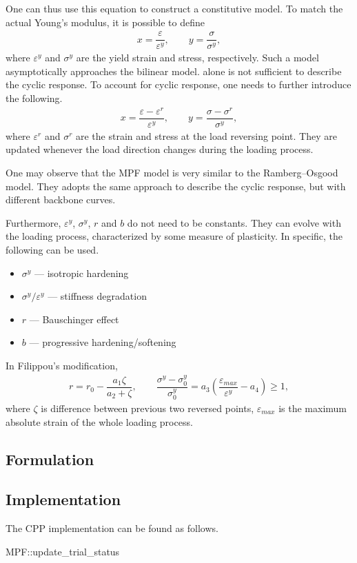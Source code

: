 One can thus use this equation to construct a constitutive model.
To match the actual Young's modulus, it is possible to define
\begin{gather}\label{eq:mpf_scaled}
	x=\dfrac{\varepsilon}{\varepsilon^y},\qquad
	y=\dfrac{\sigma}{\sigma^y},
\end{gather}
where $\varepsilon^y$ and $\sigma^y$ are the yield strain and stress, respectively.
Such a model asymptotically approaches the bilinear model.
 alone is not sufficient to describe the cyclic response.
To account for cyclic response, one needs to further introduce the following.
\begin{gather}
	x=\dfrac{\varepsilon-\varepsilon^r}{\varepsilon^y},\qquad
	y=\dfrac{\sigma-\sigma^r}{\sigma^y},
\end{gather}
where $\varepsilon^r$ and $\sigma^r$ are the strain and stress at the load reversing point.
They are updated whenever the load direction changes during the loading process.

One may observe that the MPF model is very similar to the Ramberg--Osgood model.
They adopts the same approach to describe the cyclic response, but with different backbone curves.

Furthermore, $\varepsilon^y$, $\sigma^y$, $r$ and $b$ do not need to be constants.
They can evolve with the loading process, characterized by some measure of plasticity.
In specific, the following can be used.
\begin{itemize}
	\item $\sigma^y$ --- isotropic hardening
	\item $\sigma^y/\varepsilon^y$ --- stiffness degradation
	\item $r$ --- Bauschinger effect
	\item $b$ --- progressive hardening/softening
\end{itemize}

In Filippou's modification,
\begin{gather}
	r=r_0-\dfrac{a_1\zeta}{a_2+\zeta},\qquad
	\dfrac{\sigma^y-\sigma^y_0}{\sigma^y_0}=a_3\left(\dfrac{\varepsilon_{max}}{\varepsilon^y}-a_4\right)\geqslant1,
\end{gather}
where $\zeta$ is difference between previous two reversed points, $\varepsilon_{max}$ is the maximum absolute strain of the whole loading process.
\subsection{Formulation}
\subsection{Implementation}
The CPP implementation can be found as follows.
\begin{cppcode}
MPF::update_trial_status
\end{cppcode}
